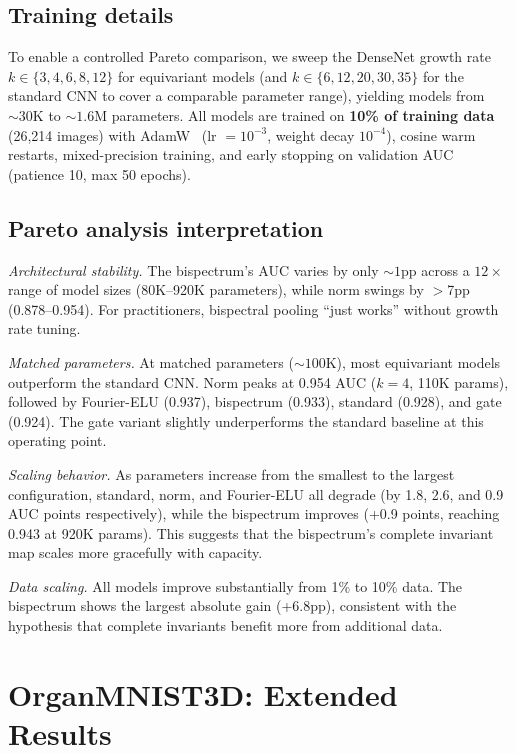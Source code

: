 \documentclass{article}
\begin{document}
\subsection{Training details}

To enable a controlled Pareto comparison, we sweep the DenseNet
growth rate $k \in \{3, 4, 6, 8, 12\}$ for equivariant models (and
$k \in \{6, 12, 20, 30, 35\}$ for the standard CNN to cover a
comparable parameter range), yielding models from ${\sim}30$K to
${\sim}1.6$M parameters. All models are trained on \textbf{10\% of
training data} (26{,}214 images) with AdamW~\citep{loshchilov2019adamw}
(lr $= 10^{-3}$, weight decay $10^{-4}$), cosine warm restarts,
mixed-precision training, and early stopping on validation AUC
(patience 10, max 50 epochs).

\subsection{Pareto analysis interpretation}

\emph{Architectural stability.}
The bispectrum's AUC varies by only ${\sim}1$pp across a $12\times$
range of model sizes (80K--920K parameters), while norm swings by
$>$7pp (0.878--0.954). For practitioners, bispectral pooling ``just
works'' without growth rate tuning.

\emph{Matched parameters.}
At matched parameters (${\sim}100$K), most equivariant models outperform
the standard CNN. Norm peaks at 0.954 AUC ($k{=}4$, 110K params),
followed by Fourier-ELU (0.937), bispectrum (0.933), standard (0.928),
and gate (0.924). The gate variant slightly underperforms the standard
baseline at this operating point.

\emph{Scaling behavior.}
As parameters increase from the smallest to the largest configuration,
standard, norm, and Fourier-ELU all degrade (by 1.8, 2.6, and 0.9
AUC points respectively), while the bispectrum improves (+0.9 points,
reaching 0.943 at 920K params). This suggests that the bispectrum's
complete invariant map scales more gracefully with capacity.

\emph{Data scaling.}
All models improve substantially from 1\% to 10\% data. The bispectrum
shows the largest absolute gain (+6.8pp), consistent with the
hypothesis that complete invariants benefit more from additional data.

\section{OrganMNIST3D: Extended Results}
\label{app:organ3d-details}
\end{document}
